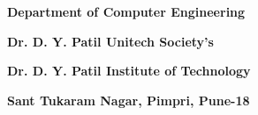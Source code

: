 \documentclass[12pt]{article}
\begin{document}
\par


\vspace{\baselineskip}

\vspace{\baselineskip}

\vspace{\baselineskip}

\vspace{\baselineskip}

\vspace{\baselineskip}

\vspace{\baselineskip}
\begin{adjustwidth}{1.0in}{-0.46in}
\begin{justify}
{\fontsize{17pt}{20.4pt}\selectfont \textbf{Department of Computer Engineering}\par}
\end{justify}\par

\end{adjustwidth}


\vspace{\baselineskip}
\begin{adjustwidth}{1.0in}{-0.47in}
\begin{justify}
{\fontsize{14pt}{16.8pt}\selectfont \textbf{Dr. D. Y. Patil Unitech Society’s}\par}
\end{justify}\par

\end{adjustwidth}

\begin{adjustwidth}{1.0in}{-0.46in}
\begin{justify}
{\fontsize{16pt}{19.2pt}\selectfont \textbf{Dr. D. Y. Patil Institute of Technology}\par}
\end{justify}\par

\end{adjustwidth}

\begin{adjustwidth}{1.0in}{-0.47in}
\begin{justify}
{\fontsize{11pt}{13.2pt}\selectfont \textbf{Sant Tukaram Nagar, Pimpri, Pune-18}\par}
\end{justify}\par

\end{adjustwidth}
\end{document}
